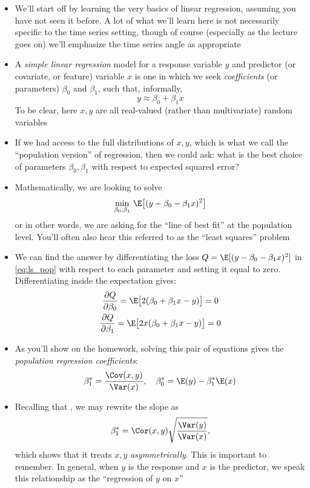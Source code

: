 \documentclass{article}
\begin{document}
\begin{itemize}
\item We'll start off by learning the very basics of linear regression, assuming
  you have not seen it before. A lot of what we'll learn here is not necessarily
  specific to the time series setting, though of course (especially as the
  lecture goes on) we'll emphasize the time series angle as appropriate

\item A \emph{simple linear regression} model for a response variable $y$ and
  predictor (or covariate, or feature) variable $x$ is one in which we seek
  \emph{coefficients} (or parameters) $\beta_0$ and $\beta_1$, such that,
  informally,  
  \[
  y \approx \beta_0 + \beta_1 x
  \]
  To be clear, here $x,y$ are all real-valued (rather than multivariate) random
  variables 

\item If we had access to the full distributions of $x,y$, which is what we call
  the ``population version'' of regression, then we could ask: what is the best
  choice of parameters $\beta_0,\beta_1$ with respect to expected squared error?  

\item Mathematically, we are looking to solve
  \begin{equation}
  \label{eq:ls_pop}
  \min_{\beta_0, \beta_1} \, \E\big[ (y - \beta_0 - \beta_1 x)^2 \big]
  \end{equation}
  or in other words, we are asking for the ``line of best fit'' at the
  population level. You'll often also hear this referred to as the ``least
  squares'' problem

\item We can find the answer by differentiating the loss $Q = \E[ (y - \beta_0 -
  \beta_1 x)^2]$ in \eqref{eq:ls_pop} with respect to each parameter and
  setting it equal to zero. Differentiating inside the expectation gives:  
  \begin{gather*}
  \frac{\partial Q}{\partial \beta_0} = \E\big[ 2(\beta_0 + \beta_1 x - y) 
  \big] = 0 \\ 
   \frac{\partial Q}{\partial \beta_1} = \E\big[ 2x (\beta_0 + \beta_1 x - y)
   \big] = 0  
  \end{gather*}
 
\item As you'll show on the homework, solving this pair of equations gives the 
  \emph{population regression coefficients}:
  \begin{equation}
  \label{eq:beta_pop}
  \beta^*_1 = \frac{\Cov(x, y)}{\Var(x)}, \quad 
  \beta^*_0 = \E(y) - \beta^*_1 \E(x)
  \end{equation}

\item Recalling that , 
  we may rewrite the slope as 
  \[
  \beta^*_1 = \Cor(x, y) \sqrt{\frac{\Var(y)}{\Var(x)}},
  \]
  which shows that it treats $x,y$ \emph{asymmetrically}. This is important to
  remember. In general, when $y$ is the response and $x$ is the predictor, we 
  speak this relationship as the ``regression of $y$ on $x$''
\end{itemize}
\end{document}
